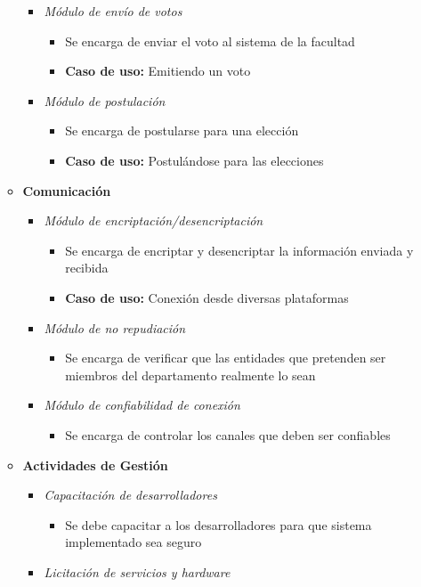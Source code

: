 \begin{itemize}
\begin{itemize}
\begin{itemize}
\begin{itemize}
\end{itemize}
 \item \emph{M\'odulo de envío de votos}
\begin{itemize}
 \item Se encarga de enviar el voto al sistema de la facultad
 \item {\bf Caso de uso:} Emitiendo un voto
\end{itemize}
 \item \emph{M\'odulo de postulación}
\begin{itemize}
 \item Se encarga de postularse para una elección
 \item {\bf Caso de uso:} Postulándose para las elecciones
\end{itemize}
\end{itemize}
 \item {\bf Comunicación}
\begin{itemize}
 \item \emph{M\'odulo de encriptación/desencriptación}
\begin{itemize}
 \item Se encarga de encriptar y desencriptar la información enviada y recibida
 \item {\bf Caso de uso:} Conexión desde diversas plataformas
\end{itemize}
 \item \emph{M\'odulo de no repudiación}
\begin{itemize}
 \item Se encarga de verificar que las entidades que pretenden ser miembros del departamento realmente lo sean
\end{itemize}
 \item \emph{M\'odulo de confiabilidad de conexión}
\begin{itemize}
 \item Se encarga de controlar los canales que deben ser confiables
\end{itemize}
\end{itemize}
 \item {\bf Actividades de Gestión}
\begin{itemize}
 \item \emph{Capacitación de desarrolladores}
\begin{itemize}
 \item Se debe capacitar a los desarrolladores para que sistema implementado sea seguro
\end{itemize}
 \item \emph{Licitación de servicios y hardware}

\end{itemize}
\end{itemize}
\end{itemize}
